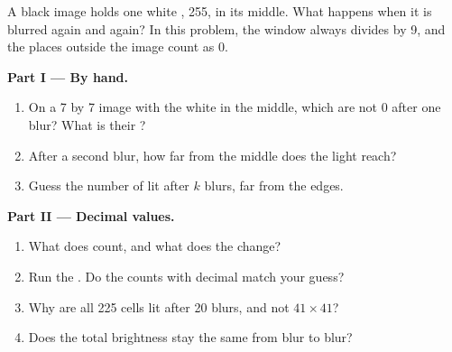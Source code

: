 \begin{problem}\label{pb:g9:grids-and-images:1}
A black image holds one white , 255, in its middle. What happens when it is
blurred again and again? In this problem, the window always divides by 9, and
the places outside the image count as 0.

\medskip\noindent\textbf{Part I --- By hand.}
\begin{enumerate}
  \item On a 7 by 7 image with the white  in the middle, which  are not
    0 after one blur? What is their ?
  \item After a second blur, how far from the middle does the light reach?
  \item Guess the number of lit  after $k$ blurs, far from the edges.
\end{enumerate}

\medskip\noindent\textbf{Part II --- Decimal values.}

\label{lst:g9:grids-and-images:spread}

\label{lst:g9:grids-and-images:spread-main}

\begin{enumerate}[resume]
  \item What does  count, and what does the  
    change?
  \item Run the . Do the counts with decimal  match your guess?
  \item Why are all 225 cells lit after 20 blurs, and not $41 \times 41$?
  \item Does the total brightness stay the same from blur to blur?
\end{enumerate}


\end{problem}
